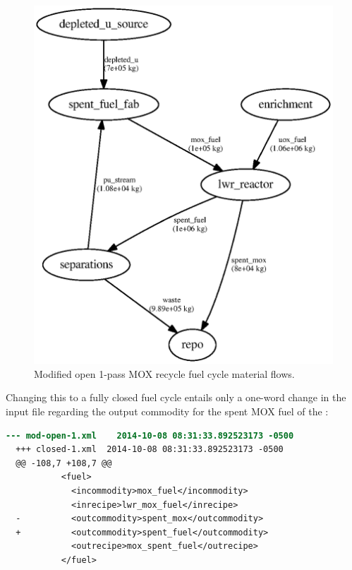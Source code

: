 \begin{figure}[H]
\begin{center}
\includegraphics{./images/flow-mod-open-1.eps}
\end{center}
\caption{Modified open 1-pass \gls{MOX} recycle fuel cycle material flows.}
\label{fig:flowmodopen}
\end{figure}

Changing this to a fully closed fuel cycle entails only a one-word change in the input file
regarding the output commodity for the spent \gls{MOX} fuel of the
: 

\begin{lstlisting}[language=diff]
  --- mod-open-1.xml	2014-10-08 08:31:33.892523173 -0500
  +++ closed-1.xml	2014-10-08 08:31:33.892523173 -0500
  @@ -108,7 +108,7 @@
           <fuel>         
             <incommodity>mox_fuel</incommodity>
             <inrecipe>lwr_mox_fuel</inrecipe>
  -          <outcommodity>spent_mox</outcommodity>
  +          <outcommodity>spent_fuel</outcommodity>
             <outrecipe>mox_spent_fuel</outrecipe>
           </fuel>
\end{lstlisting}

